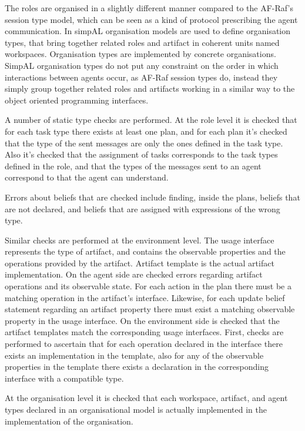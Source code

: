 \documentclass[a4paper,12pt,oneside,fleqn]{book} %
\begin{document}
The roles are organised in a slightly different manner compared to the
AF-Raf's session type model, which can be seen as a kind of protocol
prescribing the agent communication. In simpAL organisation models are used
to define organisation types, that bring together related roles and
artifact in coherent units named workspaces. Organisation types are
implemented by concrete organisations. SimpAL organisation types do not put
any constraint on the order in which interactions between agents occur, as
AF-Raf session types do, instead they simply group together related roles
and artifacts working in a similar way to the object oriented programming
interfaces.

A number of static type checks are performed. At the role level it is
checked that for each task type there exists at least one plan, and for
each plan it's checked that the type of the sent messages are only the ones
defined in the task type. Also it's checked that the assignment of tasks
corresponds to the task types defined in the role, and that the types of
the messages sent to an agent correspond to that the agent can understand.

Errors about beliefs that are checked include finding, inside the plans,
beliefs that are not declared, and beliefs that are assigned with
expressions of the wrong type.

Similar checks are performed at the environment level. The usage interface
represents the type of artifact, and contains the observable properties and
the operations provided by the artifact. Artifact template is the actual
artifact implementation. On the agent side are checked errors regarding
artifact operations and its observable state. For each action in the plan
there must be a matching operation in the artifact's interface.  Likewise,
for each update belief statement regarding an artifact property there must
exist a matching observable property in the usage interface. On the
environment side is checked that the artifact templates match the
corresponding usage interfaces. First, checks are performed to ascertain
that for each operation declared in the interface there exists an
implementation in the template, also for any of the observable properties
in the template there exists a declaration in the corresponding interface
with a compatible type.

At the organisation level it is checked that each workspace, artifact, and
agent types declared in an organisational model is actually implemented in
the implementation of the organisation.
\\~\\
\end{document}
